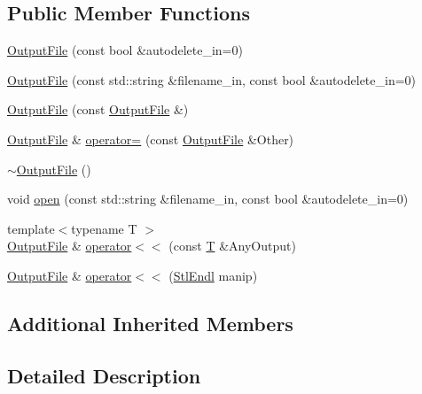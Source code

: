 \subsection*{Public Member Functions}
\begin{DoxyCompactItemize}
\item 
\hyperlink{classmodel_1_1_output_file_a30a30289f064ca20a074e682209ec8cd}{Output\+File} (const bool \&autodelete\+\_\+in=0)
\item 
\hyperlink{classmodel_1_1_output_file_a431d326a745194335c23cb72da4909b0}{Output\+File} (const std\+::string \&filename\+\_\+in, const bool \&autodelete\+\_\+in=0)
\item 
\hyperlink{classmodel_1_1_output_file_a1b8ea1c48f2f4913f22b65f71f543060}{Output\+File} (const \hyperlink{classmodel_1_1_output_file}{Output\+File} \&)
\item 
\hyperlink{classmodel_1_1_output_file}{Output\+File} \& \hyperlink{classmodel_1_1_output_file_a571df6c9ca7bd49b5c6ad612e154c682}{operator=} (const \hyperlink{classmodel_1_1_output_file}{Output\+File} \&Other)
\item 
\hyperlink{classmodel_1_1_output_file_a64ad67add7bf2ed5ddd6f77b7d7c7c83}{$\sim$\+Output\+File} ()
\item 
void \hyperlink{classmodel_1_1_output_file_a1c820b90afd703ca4e62aec20dbe3a06}{open} (const std\+::string \&filename\+\_\+in, const bool \&autodelete\+\_\+in=0)
\item 
{\footnotesize template$<$typename T $>$ }\\\hyperlink{classmodel_1_1_output_file}{Output\+File} \& \hyperlink{classmodel_1_1_output_file_a90bb9e2506b5a9a1983057bad206d290}{operator$<$$<$} (const \hyperlink{_spline_node_base__corder1_8h_a82692d3a5502b91460591f1d5504314a}{T} \&Any\+Output)
\item 
\hyperlink{classmodel_1_1_output_file}{Output\+File} \& \hyperlink{classmodel_1_1_output_file_ae8d9c05c4b722f491ed16fc44dfa7122}{operator$<$$<$} (\hyperlink{classmodel_1_1_output_file_a14f6ff52d00061ec7a6bb597ff8c4e6e}{Stl\+Endl} manip)
\end{DoxyCompactItemize}
\subsection*{Additional Inherited Members}


\subsection{Detailed Description}


